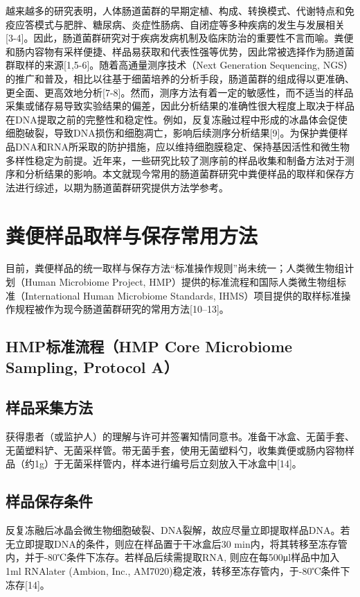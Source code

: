 越来越多的研究表明，人体肠道菌群的早期定植、构成、转换模式、代谢特点和免疫应答模式与肥胖、糖尿病、炎症性肠病、自闭症等多种疾病的发生与发展相关[3-4]。因此，肠道菌群研究对于疾病发病机制及临床防治的重要性不言而喻。粪便和肠内容物有采样便捷、样品易获取和代表性强等优势，因此常被选择作为肠道菌群取样的来源[1,5-6]。随着高通量测序技术（Next Generation Sequencing, NGS）的推广和普及，相比以往基于细菌培养的分析手段，肠道菌群的组成得以更准确、更全面、更高效地分析[7-8]。然而，测序方法有着一定的敏感性，而不适当的样品采集或储存易导致实验结果的偏差，因此分析结果的准确性很大程度上取决于样品在DNA提取之前的完整性和稳定性。例如，反复冻融过程中形成的冰晶体会促使细胞破裂，导致DNA损伤和细胞凋亡，影响后续测序分析结果[9]。为保护粪便样品DNA和RNA所采取的防护措施，应以维持细胞膜稳定、保持基因活性和微生物多样性稳定为前提。近年来，一些研究比较了测序前的样品收集和制备方法对于测序和分析结果的影响。本文就现今常用的肠道菌群研究中粪便样品的取样和保存方法进行综述，以期为肠道菌群研究提供方法学参考。

\section{粪便样品取样与保存常用方法}

目前，粪便样品的统一取样与保存方法“标准操作规则”尚未统一；人类微生物组计划（Human Microbiome Project, HMP）提供的标准流程和国际人类微生物组标准（International Human Microbiome Standards, IHMS）项目提供的取样标准操作规程被作为现今肠道菌群研究的常用方法[10–13]。

\subsection{HMP标准流程（HMP Core Microbiome Sampling, Protocol A）}
\subsection{样品采集方法}
获得患者（或监护人）的理解与许可并签署知情同意书。准备干冰盒、无菌手套、无菌塑料铲、无菌采样管。带无菌手套，使用无菌塑料勺，收集粪便或肠内容物样品（约1g）于无菌采样管内，样本进行编号后立刻放入干冰盒中[14]。
\subsection{样品保存条件}
反复冻融后冰晶会微生物细胞破裂、DNA裂解，故应尽量立即提取样品DNA。若无立即提取DNA的条件，则应在样品置于干冰盒后30 min内，将其转移至冻存管内，并于-80℃条件下冻存。若样品后续需提取RNA, 则应在每500μl样品中加入1ml RNAlater\textsuperscript{\textregistered} (Ambion, Inc., AM7020)稳定液，转移至冻存管内，于-80℃条件下冻存[14]。

